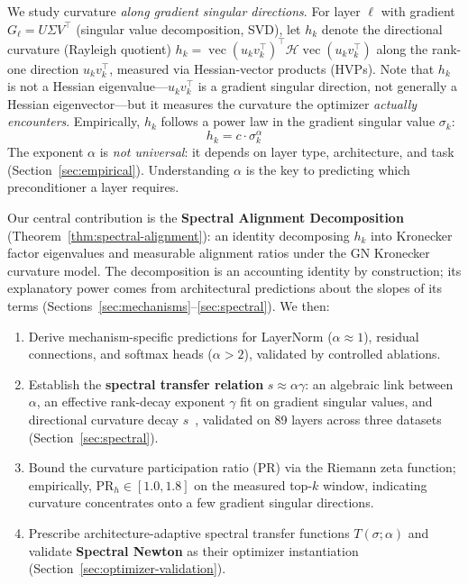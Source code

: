 \documentclass{article}
\DeclareMathOperator{\vecop}{vec}
\begin{document}
We study curvature \emph{along gradient singular directions}. For layer $\ell$ with gradient $G_\ell = U\Sigma V^\top$ (singular value decomposition, SVD), let $h_k$ denote the directional curvature (Rayleigh quotient) $h_k = \vecop(u_k v_k^\top)^\top \mathcal{H} \vecop(u_k v_k^\top)$ along the rank-one direction $u_k v_k^\top$, measured via Hessian-vector products (HVPs). Note that $h_k$ is not a Hessian eigenvalue---$u_k v_k^\top$ is a gradient singular direction, not generally a Hessian eigenvector---but it measures the curvature the optimizer \emph{actually encounters}. Empirically, $h_k$ follows a power law in the gradient singular value $\sigma_k$:
\begin{equation}\label{eq:power-law}
    h_k = c \cdot \sigma_k^\alpha
\end{equation}
The exponent $\alpha$ is \emph{not universal}: it depends on layer type, architecture, and task (Section~\ref{sec:empirical}). Understanding $\alpha$ is the key to predicting which preconditioner a layer requires.

Our central contribution is the \textbf{Spectral Alignment Decomposition} (Theorem~\ref{thm:spectral-alignment}): an identity decomposing $h_k$ into Kronecker factor eigenvalues and measurable alignment ratios under the GN Kronecker curvature model. The decomposition is an accounting identity by construction; its explanatory power comes from architectural predictions about the slopes of its terms (Sections~\ref{sec:mechanisms}--\ref{sec:spectral}). We then:
\begin{enumerate}[leftmargin=*,nosep]
    \item Derive mechanism-specific predictions for LayerNorm ($\alpha \approx 1$), residual connections, and softmax heads ($\alpha > 2$), validated by controlled ablations.
    \item Establish the \textbf{spectral transfer relation} $s \approx \alpha\gamma$: an algebraic link between $\alpha$, an effective rank-decay exponent $\gamma$ fit on gradient singular values, and directional curvature decay $s$~\cite{tang2025hessian}, validated on 89 layers across three datasets (Section~\ref{sec:spectral}).
    \item Bound the curvature participation ratio (PR) via the Riemann zeta function; empirically, $\mathrm{PR}_h \in [1.0, 1.8]$ on the measured top-$k$ window, indicating curvature concentrates onto a few gradient singular directions.
    \item Prescribe architecture-adaptive spectral transfer functions $T(\sigma;\alpha)$ and validate \textbf{Spectral Newton} as their optimizer instantiation (Section~\ref{sec:optimizer-validation}).
\end{enumerate}
\end{document}
